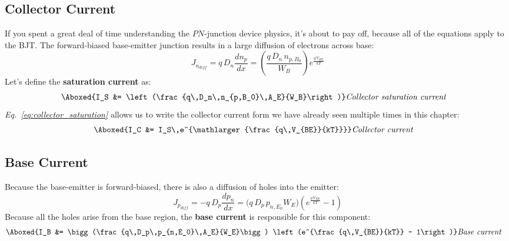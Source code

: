 \subsection{Collector Current}
If you spent a great deal of time understanding the $PN$-junction device physics, it's about to pay off, because all of the equations apply to the BJT.  The forward-biased base-emitter junction results in a large diffusion of electrons across base:
    \begin{equation}
        J_{n_{diff}} = q\,D_n\frac{d{n_p}}{dx}
        = \left( \frac{q\,D_n\,n_{p,B_0}}{W_B} \right) e^{\frac{q\,V_{BE}}{kT}}
    \end{equation}
Let's define the \textbf{saturation current} as:
    \begin{align}
        \Aboxed{I_S &= \left(\frac{q\,D_n\,n_{p,B_0}\,A_E}{W_B}\right)} &\textit{Collector saturation current}
        \label{eq:collector_saturation}
    \end{align}
\emph{Eq.~\ref{eq:collector_saturation}} allows us to write the collector current form we have already seen multiple times in this chapter:
    \begin{align}
        \Aboxed{I_C &= I_S\,e^{\mathlarger{\frac{q\,V_{BE}}{kT}}}} &\textit{Collector current}
    \end{align}
\subsection{Base Current}
Because the base-emitter is forward-biased, there is also a diffusion of holes into the emitter:
    \begin{equation}
        J_{p_{diff}} = -q\,D_p\frac{d{p_n}}{dx}
        = \bigg({q\,D_p\,p_{n,E_0}}{W_E}\bigg) \left(e^{\frac{q\,V_{BE}}{kT}} - 1\right)
    \end{equation}
Because all the holes arise from the base region, the \textbf{base current} is responsible for this component:
    \begin{align}
        \Aboxed{I_B &= \bigg(\frac{q\,D_p\,p_{n,E_0}\,A_E}{W_E}\bigg) \left(e^{\frac{q\,V_{BE}}{kT}} - 1\right)}
        &\textit{Base current}
        \label{eq:base_current}
    \end{align}

